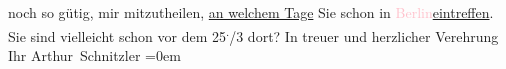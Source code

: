                     noch so gütig, mir mitzutheilen, \uline{an welchem Tage}
                    Sie schon in \textcolor{pink}{Berlin}{}\ledrightnote{\textcolor{pink}{Berlin}}{ }\uline{eintreffen}. Sie sind vielleicht schon vor dem
                        25\substVorne{}\textsuperscript{.}\substDazwischen{}/3\substHinten{} dort?\pend
           \pstart
           In treuer und herzlicher Verehrung{\\[\baselineskip]}Ihr \spacefill\mbox{Arthur Schnitzler}\pend
           \leftskip=0em{}\endnumbering{}  
      